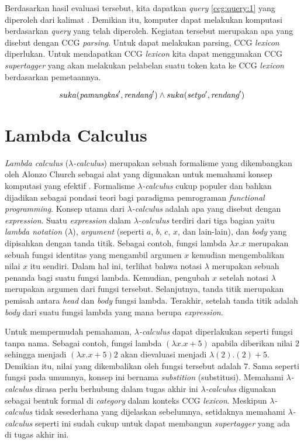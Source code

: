 Berdasarkan hasil evaluasi tersebut, kita dapatkan \textit{query} \ref{ccg:query:1}
yang diperoleh dari kalimat .
Demikian itu, komputer dapat melakukan komputasi berdasarkan \textit{query} yang telah diperoleh.
Kegiatan tersebut merupakan apa yang disebut dengan CCG \textit{parsing}.
Untuk dapat melakukan parsing, CCG \textit{lexicon} diperlukan.
Untuk mendapatkan CCG \textit{lexicon} kita dapat menggunakan CCG \textit{supertagger}
yang akan melakukan pelabelan suatu token kata ke CCG \textit{lexicon} berdasarkan
pemetaannya.

\begin{equation}\label{ccg:query:1}
  suka(\mbox{\it pamungkas}^\prime, \mbox{\it rendang}^\prime) \land suka(\mbox{\it setyo}^\prime, \mbox{\it rendang}^\prime)
\end{equation}


\section{Lambda Calculus}
\textit{Lambda calculus} ({$\lambda$}\textit{-calculus}) merupakan sebuah formalisme yang dikembangkan
oleh Alonzo Church sebagai alat yang digunakan untuk memahami konsep komputasi yang efektif
\cite{DBLP:journals/corr/Rojas15}.
Formalisme {$\lambda$}\textit{-calculus} cukup populer dan bahkan dijadikan sebagai pondasi teori bagi
paradigma pemrograman \textit{functional programming}.
Konsep utama dari {$\lambda$}\textit{-calculus} adalah apa yang disebut dengan \textit{expression}.
Suatu \textit{expression} dalam {$\lambda$}\textit{-calculus} terdiri dari tiga bagian yaitu
\textit{lambda notation} ({$\lambda$}), \textit{argument} (seperti $a$, $b$, $c$, $x$, dan lain-lain),
dan \textit{body} yang dipisahkan dengan tanda titik.
Sebagai contoh, fungsi lambda ${\lambda}x. x$ merupakan sebuah fungsi identitas yang mengambil
argumen $x$ kemudian mengembalikan nilai $x$ itu sendiri.
Dalam hal ini, terlihat bahwa notasi {$\lambda$} merupakan sebuah penanda bagi suatu fungsi lambda.
Kemudian, pengubah $x$ setelah notasi {$\lambda$} merupakan argumen dari fungsi tersebut.
Selanjutnya, tanda titik merupakan pemisah antara \textit{head} dan \textit{body} fungsi lambda.
Terakhir, setelah tanda titik adalah \textit{body} dari suatu fungsi lambda yang mana berupa
\textit{expression}.

Untuk mempermudah pemahaman, {$\lambda$}\textit{-calculus} dapat diperlakukan seperti fungsi tanpa
nama. Sebagai contoh, fungsi lambda $({\lambda}x. x + 5)$ apabila diberikan nilai $2$ sehingga
menjadi $({\lambda}x. x + 5) 2$ akan dievaluasi menjadi ${\lambda}(2). (2) + 5$.
Demikian itu, nilai yang dikembalikan oleh fungsi tersebut adalah $7$.
Sama seperti fungsi pada umumnya, konsep ini bernama \textit{substition} (substitusi).
Memahami {$\lambda$}\textit{-calculus} dirasa perlu berhubung dalam tugas akhir ini
{$\lambda$}\textit{-calculus} digunakan sebagai bentuk formal di \textit{category}
dalam konteks CCG \textit{lexicon}. Meskipun {$\lambda$}\textit{-calculus} tidak sesederhana
yang dijelaskan sebelumnya, setidaknya memahami {$\lambda$}\textit{-calculus} seperti ini
sudah cukup untuk dapat membangun \textit{supertagger} yang ada di tugas akhir ini.


